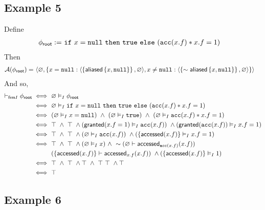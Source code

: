 \subsection*{Example 5}

Define
\begin{align*}
{\phi_\textsf{root}} := & \
\texttt{if} \ x = \texttt{null} \ \texttt{then} \ \texttt{true} \ \texttt{else} \ (\texttt{acc}(x.f) \ast x.f = 1)
\end{align*}
Then
\begin{align*}
\mathcal{A}({\phi_\textsf{root}}) = & \
\langle \varnothing, \left\{ 
  x = \texttt{null}: \langle \left\{  \textsf{aliased}\left\{ x, \texttt{null} \right\}  \right\}, \varnothing \rangle,
  x \neq \texttt{null}: \langle \left\{  \sim\textsf{aliased}\left\{ x, \texttt{null} \right\}  \right\}, \varnothing \rangle
 \right\} \rangle
\end{align*}
And so,
\begin{align*}
\vdash_{\textsf{frm}I} {\phi_\textsf{root}}
\iff & \
\varnothing \vDash_I {\phi_\textsf{root}}
\\ \iff & \
  \varnothing
  \vDash_I
  \texttt{if} \ x = \texttt{null} \ \texttt{then} \ \texttt{true} \ \texttt{else} \ (\texttt{acc}(x.f) \ast x.f = 1)
\\ \iff & \
  (\varnothing \vDash_I x = \texttt{null}) \ \land \
  (\varnothing \vDash_I \texttt{true}) \ \land \
  (\varnothing \vDash_I \texttt{acc}(x.f) \ast x.f = 1)
\\ \iff & \
  \top \ \land \ \top \ \land
  ( \textsf{granted}(x.f = 1) \vDash_I \texttt{acc}(x.f) ) \ \land
  ( \textsf{granted}(\texttt{acc}(x.f)) \vDash_I x.f = 1 )
\\ \iff & \
  \top \ \land \ \top \ \land
  ( \varnothing \vDash_I \texttt{acc}(x.f) ) \ \land
  ( \left\{  \textsf{accessed}(x.f)  \right\} \vDash_I x.f = 1 )
\\ \iff & \
  \top \ \land \ \top \ \land
  ( \varnothing \vDash_I x ) \ \land \ \sim (\varnothing \vdash \textsf{accessed}_{\texttt{acc}(x.f)}(x.f) ) \\ & \
  ( \left\{  \textsf{accessed}(x.f)  \right\} \vdash \textsf{accessed}_{x.f}(x.f) ) \ \land
  ( \left\{  \textsf{accessed}(x.f)  \right\} \vDash_I 1 )
\\ \iff & \
  \top \ \land \ \top \ \land
  \top \ \land \ \top \
  \top \ \land
  \top
\\ \iff & \
  \top
\end{align*}

\newpage
\subsection*{Example 6}

